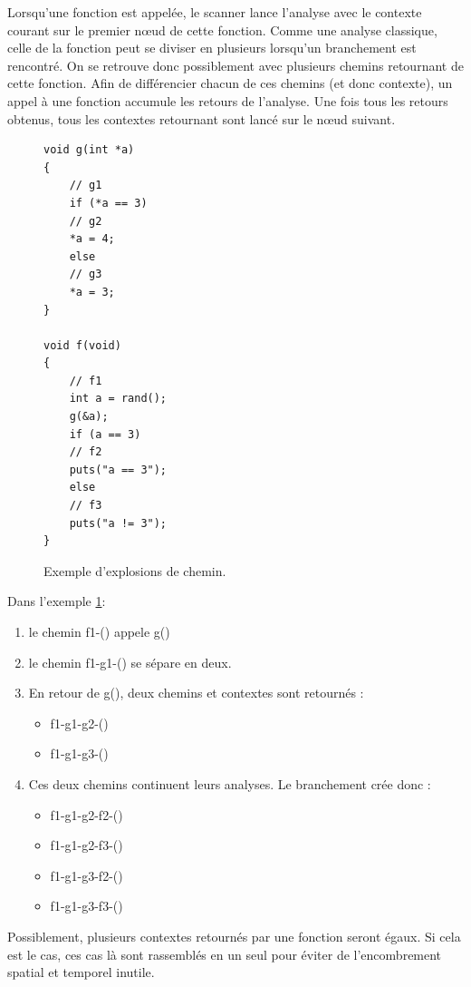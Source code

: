 Lorsqu'une fonction est appelée, le scanner lance l'analyse avec le contexte courant sur le premier nœud de cette fonction. Comme une analyse classique, celle de la fonction peut se diviser
en plusieurs lorsqu'un branchement est rencontré. On se retrouve donc possiblement avec plusieurs chemins retournant de cette fonction. Afin de différencier chacun de ces chemins (et donc contexte),
un appel à une fonction accumule les retours de l'analyse. Une fois tous les retours obtenus, tous les contextes retournant sont lancé sur le nœud suivant.
\begin{figure}[h]
    \centering
    \begin {lstlisting}[frame=single]
void g(int *a)
{
    // g1
    if (*a == 3)
    // g2
    *a = 4;
    else
    // g3
    *a = 3;
}

void f(void)
{
    // f1
    int a = rand();
    g(&a);
    if (a == 3)
    // f2
    puts("a == 3");
    else
    // f3
    puts("a != 3");
}
    \end{lstlisting}
    \caption{Exemple d'explosions de chemin.}
    \label{fig:path-explosion}
\end{figure}
Dans l'exemple \ref{fig:path-explosion}:
\begin{enumerate}
    \item le chemin f1-() appele g()
    \item le chemin f1-g1-() se sépare en deux.
    \item En retour de g(), deux chemins et contextes sont retournés :
    \begin{itemize}
        \item f1-g1-g2-()
        \item f1-g1-g3-()
    \end{itemize}
    \item Ces deux chemins continuent leurs analyses. Le branchement crée donc :
            \begin{itemize}
                \item f1-g1-g2-f2-()
                \item f1-g1-g2-f3-()
                \item f1-g1-g3-f2-()
                \item f1-g1-g3-f3-()
            \end{itemize}
\end{enumerate}
Possiblement, plusieurs contextes retournés par une fonction seront égaux. Si cela est le cas,
ces cas là sont rassemblés en un seul pour éviter de l'encombrement spatial et temporel inutile.

